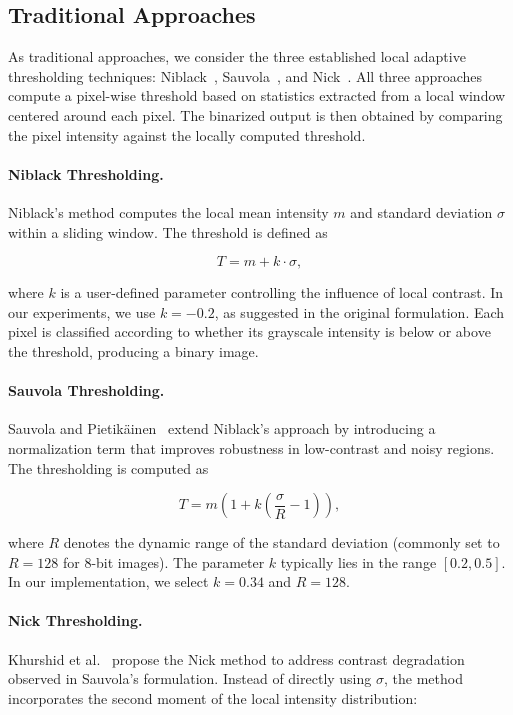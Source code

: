 \subsection{Traditional Approaches}\label{subsec:traditional}

As traditional approaches, we consider the three established local adaptive thresholding techniques: Niblack~\cite{Niblack1985}, Sauvola~\cite{Sauvola1997}, and Nick~\cite{Khurshid2009}.
All three approaches compute a pixel-wise threshold based on statistics extracted from a local window centered around each pixel.
The binarized output is then obtained by comparing the pixel intensity against the locally computed threshold. 

\paragraph{Niblack Thresholding.}
Niblack's method computes the local mean intensity $m$ and standard deviation $\sigma$ within a sliding window.
The threshold is defined as

\begin{equation}
    T = m + k \cdot \sigma ,
\end{equation}

where $k$ is a user-defined parameter controlling the influence of local contrast. 
In our experiments, we use $k=-0.2$, as suggested in the original formulation.
Each pixel is classified according to whether its grayscale intensity is below or above the threshold, producing a binary image.

\paragraph{Sauvola Thresholding.}
Sauvola and Pietikäinen~\cite{Sauvola1997} extend Niblack's approach by introducing a normalization term that improves robustness in low-contrast and noisy regions.
The thresholding is computed as

\begin{equation}
    T = m \left(1 + k \left(\frac{\sigma}{R} - 1\right)\right) ,
\end{equation}

where $R$ denotes the dynamic range of the standard deviation (commonly set to $R=128$ for 8-bit images).
The parameter $k$ typically lies in the range $[0.2, 0.5]$. 
In our implementation, we select $k = 0.34$ and $R = 128$. 

\paragraph{Nick Thresholding.}
Khurshid et al.~\cite{Khurshid2009} propose the Nick method to address contrast degradation observed in Sauvola's formulation.
Instead of directly using $\sigma$, the method incorporates the second moment of the local intensity distribution:

